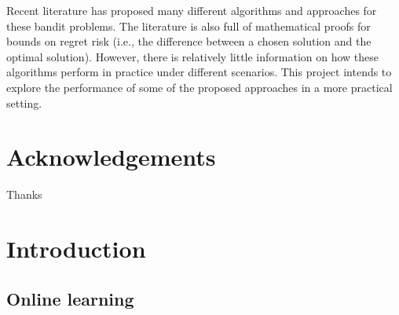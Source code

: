 Recent literature has proposed many different algorithms and approaches for these bandit problems. The literature is also full of mathematical proofs for bounds on regret risk (i.e., the difference between a chosen solution and the optimal solution). However, there is relatively little information on how these algorithms perform in practice under different scenarios. This project intends to explore the performance of some of the proposed approaches in a more practical setting.

\pagebreak

\vfill %


\section{Acknowledgements}
Thanks

\pagebreak


\tableofcontents %
\listoffigures
\listoftables

\pagebreak


\section{Introduction}

\subsection{Online learning}

